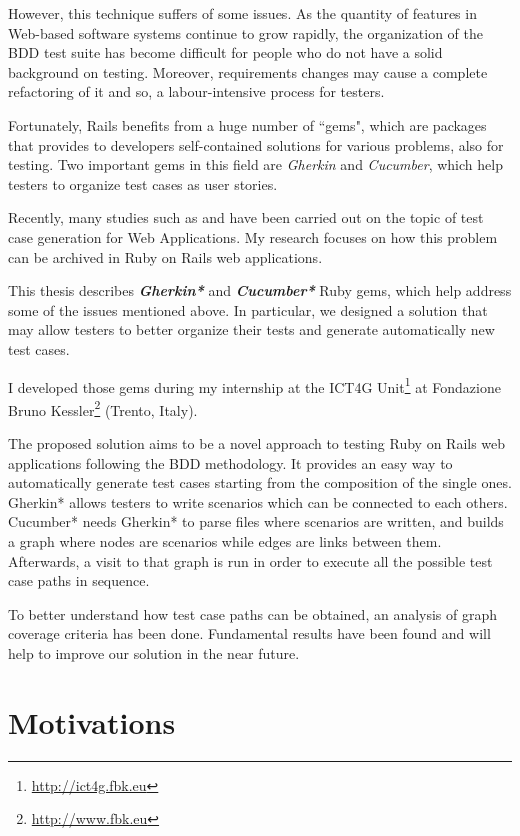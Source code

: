 However, this technique suffers of some issues. As the quantity of features in Web-based software systems continue to grow rapidly, the organization of the BDD test suite has become difficult for people who do not have a solid background on testing. Moreover, requirements changes may cause a complete refactoring of it and so, a labour-intensive process for testers.

Fortunately, Rails benefits from a huge number of ``gems", which are packages that provides to developers self-contained solutions for various problems, also for testing. Two important gems in this field are \textit{Gherkin} and \textit{Cucumber}, which help testers to organize test cases as user stories.  

Recently, many studies such as \cite{novel_approach} and \cite{article:testing_web_app_with_fsms} have been carried out on the topic of test case generation for Web Applications. My research focuses on how this problem can be archived in Ruby on Rails web applications.

This thesis describes \textbf{\textit{Gherkin*}} and \textbf{\textit{Cucumber*}} Ruby gems, which help address some of the issues mentioned above. In particular, we designed a solution that may allow testers to better organize their tests and generate automatically new test cases.

I developed those gems during my internship at the ICT4G Unit\footnote{\url{http://ict4g.fbk.eu}} at Fondazione Bruno Kessler\footnote{\url{http://www.fbk.eu}} (Trento, Italy).

The proposed solution aims to be a novel approach to testing Ruby on Rails web applications following the BDD methodology. It provides an easy way to automatically generate test cases starting from the composition of the single ones. Gherkin* allows testers to write scenarios which can be connected to each others. Cucumber* needs Gherkin* to parse files where scenarios are written, and builds a graph where nodes are scenarios while edges are links between them. Afterwards, a visit to that graph is run in order to execute all the possible test case paths in sequence.

To better understand how test case paths can be obtained, an analysis of graph coverage criteria has been done. Fundamental results have been found and will help to improve our solution in the near future.

\newpage
\section{Motivations}

